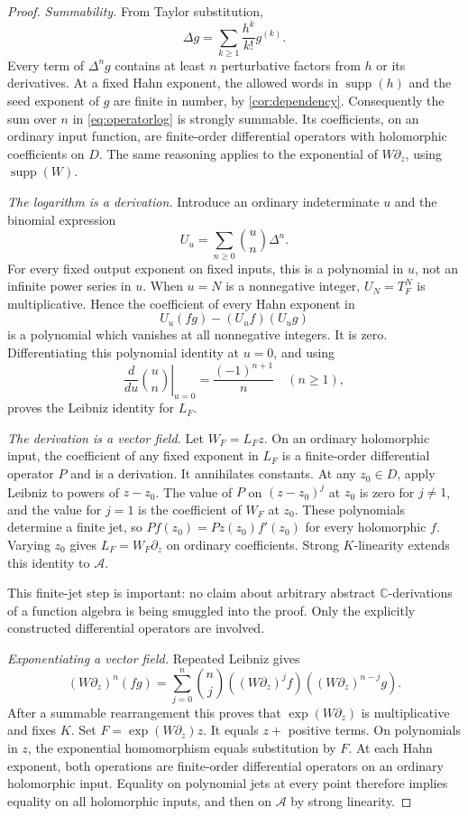 \documentclass[11pt,a4paper]{article}
\numberwithin{equation}{section}
\theoremstyle{definition}
\theoremstyle{remark}
\newcommand{\C}{\mathbb C}
\newcommand{\A}{\mathcal A}
\newcommand{\supp}{\operatorname{supp}}
\begin{document}
\begin{proof}
\emph{Summability.}
From Taylor substitution,
\[
 \Delta g=\sum_{k\geq1}\frac{h^k}{k!}g^{(k)}.
\]
Every term of $\Delta^n g$ contains at least $n$ perturbative factors from
$h$ or its derivatives.  At a fixed Hahn exponent, the allowed words in
$\supp(h)$ and the seed exponent of $g$ are finite in number, by
\cref{cor:dependency}.  Consequently the sum over $n$ in
\eqref{eq:operatorlog} is strongly summable.  Its coefficients, on an
ordinary input function, are finite-order differential operators with
holomorphic coefficients on $D$.  The same reasoning applies to the
exponential of $W\partial_z$, using $\supp(W)$.

\emph{The logarithm is a derivation.}
Introduce an ordinary indeterminate $u$ and the binomial expression
\[
 U_u=\sum_{n\geq0}\binom un\Delta^n.
\]
For every fixed output exponent on fixed inputs, this is a polynomial in
$u$, not an infinite power series in $u$.  When $u=N$ is a nonnegative
integer, $U_N=T_F^N$ is multiplicative.  Hence the coefficient of every
Hahn exponent in
\[
 U_u(fg)-(U_uf)(U_ug)
\]
is a polynomial which vanishes at all nonnegative integers.  It is zero.
Differentiating this polynomial identity at $u=0$, and using
\[
 \left.\frac{d}{du}\binom un\right|_{u=0}
   =\frac{(-1)^{n+1}}n\quad(n\geq1),
\]
proves the Leibniz identity for $L_F$.

\emph{The derivation is a vector field.}
Let $W_F=L_Fz$.  On an ordinary holomorphic input, the coefficient of any
fixed exponent in $L_F$ is a finite-order differential operator $P$ and
is a derivation.  It annihilates constants.  At any $z_0\in D$, apply
Leibniz to powers of $z-z_0$.  The value of $P$ on $(z-z_0)^j$ at $z_0$
is zero for $j\ne1$, and the value for $j=1$ is the coefficient of $W_F$
at $z_0$.  These polynomials determine a finite jet, so
$P f(z_0)=Pz(z_0)f'(z_0)$ for every holomorphic $f$.  Varying $z_0$ gives
$L_F=W_F\partial_z$ on ordinary coefficients.  Strong $K$-linearity
extends this identity to $\A$.

This finite-jet step is important: no claim about arbitrary abstract
$\C$-derivations of a function algebra is being smuggled into the proof.
Only the explicitly constructed differential operators are involved.

\emph{Exponentiating a vector field.}
Repeated Leibniz gives
\[
 (W\partial_z)^n(fg)=\sum_{j=0}^n\binom nj
    ((W\partial_z)^j f)((W\partial_z)^{n-j}g).
\]
After a summable rearrangement this proves that
$\exp(W\partial_z)$ is multiplicative and fixes $K$.
Set $F=\exp(W\partial_z)z$.  It equals $z+$ positive terms.
On polynomials in $z$, the exponential homomorphism equals substitution by
$F$.  At each Hahn exponent, both operations are finite-order differential
operators on an ordinary holomorphic input.  Equality on polynomial jets
at every point therefore implies equality on all holomorphic inputs, and
then on $\A$ by strong linearity.


\end{proof}
\end{document}
